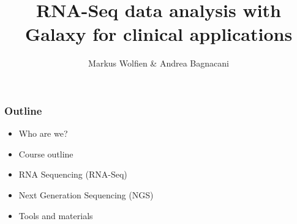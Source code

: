 \documentclass[x11names, svgnames]{beamer}
\title{RNA-Seq data analysis with Galaxy for clinical applications}
\author{Markus Wolfien \& Andrea Bagnacani}
\begin{document}
%
%



%
%
\newcommand{\one}{Who are we?}
\newcommand{\two}{Course outline}
\newcommand{\three}{RNA Sequencing (RNA-Seq)}
\newcommand{\four}{Next Generation Sequencing (NGS)}
\newcommand{\five}{Tools and materials}
\begin{frame}
  \frametitle{Outline}
  \begin{itemize}
    \itemsep1em
    \item \one
    \item \two
    \item \three
    \item \four
    \item \five
  \end{itemize}
\end{frame}
\end{document}
